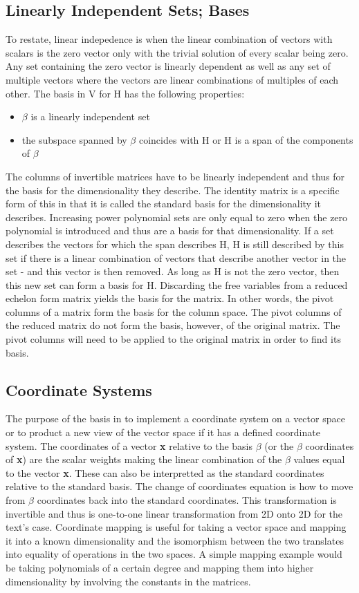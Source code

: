 \documentclass[12pt]{article}
\begin{document}
\subsection{Linearly Independent Sets; Bases}
To restate, linear indepedence is when the linear combination of vectors with scalars is the zero vector only with the trivial 
solution of every scalar being zero. Any set containing the zero vector is linearly dependent as well as any set of multiple 
vectors where the vectors are linear combinations of multiples of each other. The basis in V for H has the following properties:
\begin{itemize}
    \item $\beta$ is a linearly independent set
    \item the subspace spanned by $\beta$ coincides with H or H is a span of the components of $\beta$ 
\end{itemize}
The columns of invertible matrices have to be linearly independent and thus for the basis for the dimensionality they describe. The identity 
matrix is a specific form of this in that it is called the standard basis for the dimensionality it describes. Increasing power polynomial 
sets are only equal to zero when the zero polynomial is introduced and thus are a basis for that dimensionality. If a set describes the 
vectors for which the span describes H, H is still described by this set if there is a linear combination of vectors that describe another 
vector in the set - and this vector is then removed. As long as H is not the zero vector, then this new set can form a basis for H. 
Discarding the free variables from a reduced echelon form matrix yields the basis for the matrix. In other words, the pivot columns of 
a matrix form the basis for the column space. The pivot columns of the reduced matrix do not form the basis, however, of the original
matrix. The pivot columns will need to be applied to the original matrix in order to find its basis. 
\subsection{Coordinate Systems}
The purpose of the basis in to implement a coordinate system on a vector space or to product a new view of the vector space if it has a 
defined coordinate system. The coordinates of a vector \textbf{x} relative to the basis $\beta$ (or the $\beta$ coordinates of \textbf{x}) are 
the scalar weights making the linear combination of the $\beta$ values equal to the vector \textbf{x}. These can also be interpretted as the 
standard coordinates relative to the standard basis. The change of coordinates equation is how to move from $\beta$ coordinates back into 
the standard coordinates. This transformation is invertible and thus is one-to-one linear transformation from 2D onto 2D for the text's 
case. Coordinate mapping is useful for taking a vector space and mapping it into a known dimensionality and the isomorphism between the 
two translates into equality of operations in the two spaces. A simple mapping example would be taking polynomials of a certain degree and 
mapping them into higher dimensionality by involving the constants in the matrices. 
    
\end{document}
